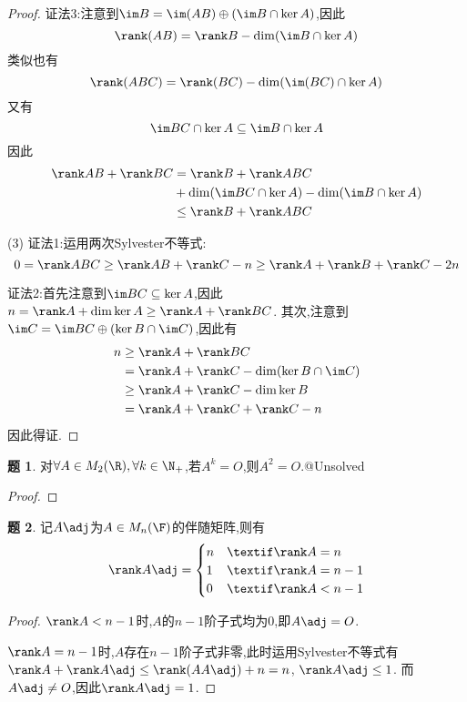 \documentclass{article}
\theoremstyle{definition}
\newtheorem{exercise}{题}[section]
\begin{document}
\begin{proof}
    证法3:注意到$\im B=\im (AB)\oplus(\im B\cap \ker A)$,因此$$\rank (AB)=\rank B-\dim(\im B\cap \ker A)$$
    类似也有$$\rank (ABC)=\rank(BC)-\dim(\im(BC)\cap \ker A)$$
    又有$$\im BC\cap \ker A\subseteq \im B\cap \ker A$$
    因此$$\begin{aligned}
        \rank AB+\rank BC&=\rank B+\rank ABC\\&+\dim(\im BC\cap \ker A)-\dim(\im B\cap \ker A)\\ &\leq \rank B+\rank ABC
    \end{aligned}$$

    (3) 证法1:运用两次Sylvester不等式:$$0=\rank ABC\geq \rank AB+\rank C-n\geq \rank A+\rank B+\rank C-2n$$

    证法2:首先注意到$\im BC\subseteq \ker A$,因此$n=\rank A+\dim \ker A\geq \rank A+\rank BC$.
    其次,注意到$\im C=\im BC\oplus (\ker B\cap \im C)$,因此有
    $$\begin{aligned}
        n&\geq \rank A+\rank BC\\&=\rank A+\rank C-\dim (\ker B\cap \im C)\\&\geq \rank A+\rank C-\dim \ker B\\&=\rank A+\rank C+\rank C-n
    \end{aligned}$$
    因此得证.
\end{proof}

\begin{exercise}
    对$\forall A\in M_2(\R), \forall k\in \N_+$,若$A^k=O$,则$A^2=O$.@Unsolved
\end{exercise}
\begin{proof}
    
\end{proof}

\begin{exercise}\label{adjmat1}
    记$A\adj$为$A\in M_n(\F)$的伴随矩阵,则有
    $$\rank A\adj=\begin{cases}
    n&\textif \rank A=n\\
    1&\textif \rank A=n-1\\
    0&\textif \rank A<n-1
    \end{cases}$$
\end{exercise}
\begin{proof}
    $\rank A<n-1$时,$A$的$n-1$阶子式均为0,即$A\adj=O$.

    $\rank A=n-1$时,$A$存在$n-1$阶子式非零,此时运用Sylvester不等式有$\rank A+\rank A\adj\leq \rank (AA\adj)+n=n$, $\rank A\adj\leq 1$.
    而$A\adj\neq O$,因此$\rank A\adj=1$.
\end{proof}
\end{document}
